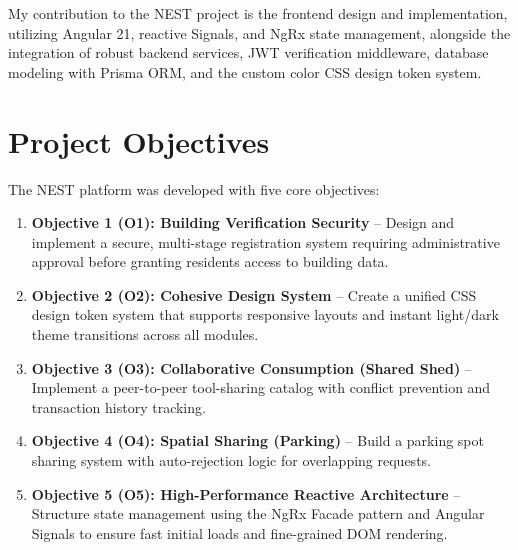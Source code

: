 My contribution to the NEST project is the frontend design and implementation, utilizing Angular 21, reactive Signals, and NgRx state management, alongside the integration of robust backend services, JWT verification middleware, database modeling with Prisma ORM, and the custom color CSS design token system.

\section{Project Objectives}
The NEST platform was developed with five core objectives:
\begin{enumerate}
    \item \textbf{Objective 1 (O1): Building Verification Security} -- Design and implement a secure, multi-stage registration system requiring administrative approval before granting residents access to building data.
    \item \textbf{Objective 2 (O2): Cohesive Design System} -- Create a unified CSS design token system that supports responsive layouts and instant light/dark theme transitions across all modules.
    \item \textbf{Objective 3 (O3): Collaborative Consumption (Shared Shed)} -- Implement a peer-to-peer tool-sharing catalog with conflict prevention and transaction history tracking.
    \item \textbf{Objective 4 (O4): Spatial Sharing (Parking)} -- Build a parking spot sharing system with auto-rejection logic for overlapping requests.
    \item \textbf{Objective 5 (O5): High-Performance Reactive Architecture} -- Structure state management using the NgRx Facade pattern and Angular Signals to ensure fast initial loads and fine-grained DOM rendering.
\end{enumerate}


